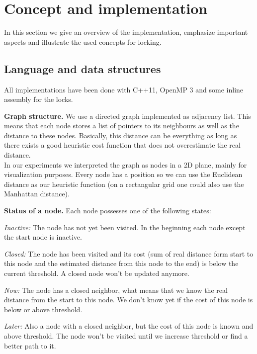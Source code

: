 \documentclass[letterpaper]{article}
\newcommand{\mypar}[1]{{\bf #1.}}
\begin{document}
\section{Concept and implementation}\label{sec:impl}

In this section we give an overview of the implementation, emphasize important aspects and illustrate the used concepts for locking. 

\subsection{Language and data structures}\label{ssec:lang}

All implementations have been done with C++11, OpenMP 3 and some inline assembly for the locks.

\mypar{Graph structure}
We use a directed graph implemented as adjacency list. This means that each node stores a list of pointers to its neighbours as well as the distance to these nodes. Basically, this distance can be everything as long as there exists a good heuristic cost function that does not overestimate the real distance. \\
In our experiments we interpreted the graph as nodes in a 2D plane, mainly for visualization purposes. Every node has a position so we can use the Euclidean distance as our heuristic function (on a rectangular grid one could also use the Manhattan distance).

\mypar{Status of a node} Each node possesses one of the following states:
\begin{compactitem}
\item \textit{Inactive:} The node has not yet been visited. In the beginning each node except the start node is inactive.
\item \textit{Closed:} The node has been visited and its cost (sum of real distance form start to this node and the estimated distance from this node to the end) is below the current threshold. A closed node won't be updated anymore.
\item \textit{Now:} The node has a closed neighbor, what means that we know the real distance from the start to this node. We don't know yet if the cost of this node is below or above threshold.
\item \textit{Later:} Also a node with a closed neighbor, but the cost of this node is known and above threshold. The node won't be visited until we increase threshold or find a better path to it.
\end{compactitem}
\end{document}
